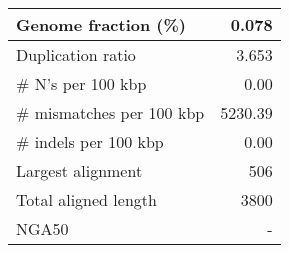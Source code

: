 \documentclass[12pt,a4paper]{article}
\begin{document}
\begin{table}[ht]
\begin{center}
\begin{tabular}{|l*{1}{|r}|}
Genome fraction (\%) & 0.078 \\ \hline
Duplication ratio & 3.653 \\ \hline
\# N's per 100 kbp & 0.00 \\ \hline
\# mismatches per 100 kbp & 5230.39 \\ \hline
\# indels per 100 kbp & 0.00 \\ \hline
Largest alignment & 506 \\ \hline
Total aligned length & 3800 \\ \hline
NGA50 & - \\ \hline
\end{tabular}
\end{center}
\end{table}
\end{document}

